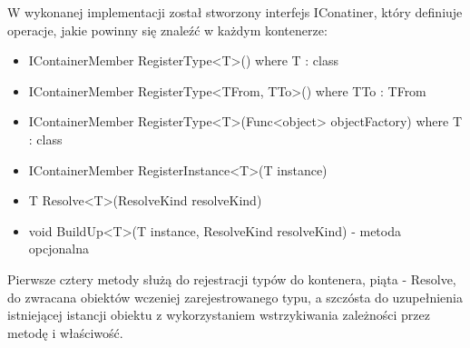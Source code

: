 \documentclass[12pt]{article}
\begin{document}
W wykonanej implementacji został stworzony interfejs IConatiner, który definiuje operacje, jakie powinny się znaleźć w każdym kontenerze:
\begin{itemize}
	\item IContainerMember RegisterType<T>() where T : class
	\item IContainerMember RegisterType<TFrom, TTo>() where TTo : TFrom
	\item IContainerMember RegisterType<T>(Func<object> objectFactory) where T : class
	\item IContainerMember RegisterInstance<T>(T instance)
	\item T Resolve<T>(ResolveKind resolveKind)
	\item void BuildUp<T>(T instance, ResolveKind resolveKind) - metoda opcjonalna
\end{itemize}
Pierwsze cztery metody służą do rejestracji typów do kontenera, piąta - Resolve, do zwracana obiektów wczeniej zarejestrowanego typu, a szczósta do uzupełnienia istniejącej istancji obiektu z wykorzystaniem wstrzykiwania zależności przez metodę i właściwość.
\end{document}
